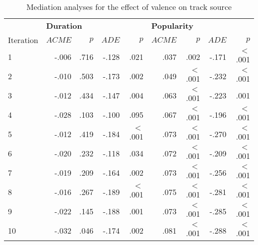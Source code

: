 \begin{table}[ht]
\centering
\small

\begin{threeparttable}
\caption{Mediation analyses for the effect of valence on track source}
\label{tab:val-3}

\begin{tabular*}{\textwidth}{@{\extracolsep{\fill}}lrrrrrrrr@{}}

\toprule & 
\multicolumn{4}{l}{\textbf{Duration}} & \multicolumn{4}{l}{\textbf{Popularity}} \\ 
\cmidrule{2-9}

Iteration & $ACME$   & $p$   & $ADE$  & $p$       & $ACME$  & $p$       & $ADE$  & $p$      \\ 
\midrule

1         & -.006    & .716  & -.128  & .021      & .037    & .002      & -.171  & $<$ .001 \\
2         & -.010    & .503  & -.173  & .002      & .049    & $<$ .001  & -.232  & $<$ .001 \\
3         & -.012    & .434  & -.147  & .004      & .063    & $<$ .001  & -.223  & .001     \\
4         & -.028    & .103  & -.100  & .095      & .067    & $<$ .001  & -.196  & $<$ .001 \\
5         & -.012    & .419  & -.184  & $<$ .001  & .073    & $<$ .001  & -.270  & $<$ .001 \\
6         & -.020    & .232  & -.118  & .034      & .072    & $<$ .001  & -.209  & $<$ .001 \\
7         & -.019    & .209  & -.164  & .002      & .073    & $<$ .001  & -.256  & $<$ .001 \\
8         & -.016    & .267  & -.189  & $<$ .001  & .075    & $<$ .001  & -.281  & $<$ .001 \\
9         & -.022    & .145  & -.188  & .001      & .073    & $<$ .001  & -.285  & $<$ .001 \\
10        & -.032    & .046  & -.174  & .002      & .081    & $<$ .001  & -.288  & $<$ .001 \\ 
\bottomrule

\end{tabular*}
\end{threeparttable}
\end{table}